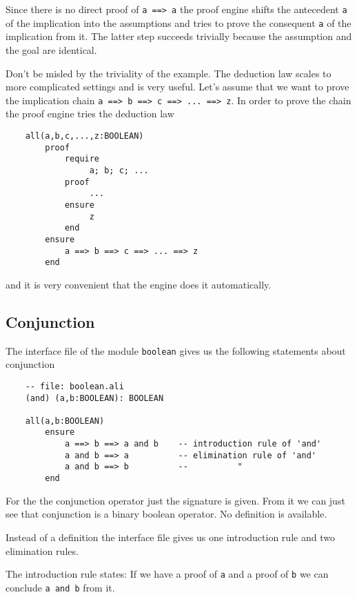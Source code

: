 Since there is no direct proof of \lstinline!a ==> a! the proof engine shifts the
antecedent \lstinline!a! of the implication into the assumptions and tries to prove the
consequent \lstinline!a! of the implication from it. The latter step succeeds trivially
because the assumption and the goal are identical.

Don't be misled by the triviality of the example. The deduction law scales to
more complicated settings and is very useful. Let's assume that we want to
prove the implication chain \lstinline!a ==> b ==> c ==> ... ==> z!. In order to prove
the chain the proof engine tries the deduction law

\begin{lstlisting}
    all(a,b,c,...,z:BOOLEAN)
        proof
            require
                 a; b; c; ...
            proof
                 ...
            ensure
                 z
            end
        ensure
            a ==> b ==> c ==> ... ==> z
        end
\end{lstlisting}

and it is very convenient that the engine does it automatically.




\subsection{Conjunction}

The interface file of the module \lstinline!boolean! gives us the following statements
about conjunction

\begin{lstlisting}
    -- file: boolean.ali
    (and) (a,b:BOOLEAN): BOOLEAN

    all(a,b:BOOLEAN)
        ensure
            a ==> b ==> a and b    -- introduction rule of 'and'
            a and b ==> a          -- elimination rule of 'and'
            a and b ==> b          --          "
        end
\end{lstlisting}

For the the conjunction operator just the signature is given. From it we can
just see that conjunction is a binary boolean operator. No definition is
available.

Instead of a definition the interface file gives us one introduction rule and
two elimination rules.

The introduction rule states: If we have a proof of \lstinline!a! and a proof
of \lstinline!b! we can conclude \lstinline!a and b! from it.

